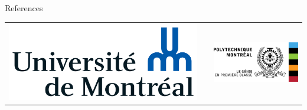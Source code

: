 \documentclass[final]{beamer}
\newlength{\onecolwid}
\begin{document}
\begin{frame}[t]
\begin{columns}[t]
\begin{column}{\onecolwid}
\begin{block}{References}

\end{block}








\begin{center}
\begin{tabular}{ccc}
\includegraphics[width=0.4\linewidth]{Udem.png} & \hfill &  \includegraphics[width=0.4\linewidth]{Poly.png}
\end{tabular}
\end{center}

\end{column} %
\end{columns} %
\end{frame} %
\end{document}
